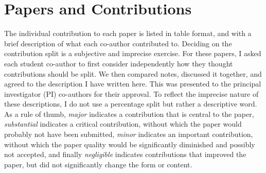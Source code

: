 \section{Papers and Contributions}
The individual contribution to each paper is listed in table format, and with a brief description of what each co-author contributed to. Deciding on the contribution split is a subjective and imprecise exercise. For these papers, I asked each student co-author to first consider independently how they thought contributions should be split. We then compared notes, discussed it together, and agreed to the description I have written here. This was presented to the principal investigator (PI) co-authors for their approval. To reflect the imprecise nature of these descriptions, I do not use a percentage split but rather a descriptive word. As a rule of thumb, \emph{major} indicates a contribution that is central to the paper, \emph{substantial} indicates a critical contribution, without which the paper would probably not have been submitted, \emph{minor} indicates an important contribution, without which the paper quality would be significantly diminished and possibly not accepted, and finally \emph{negligible} indicates contributions that improved the paper, but did not significantly change the form or content.

